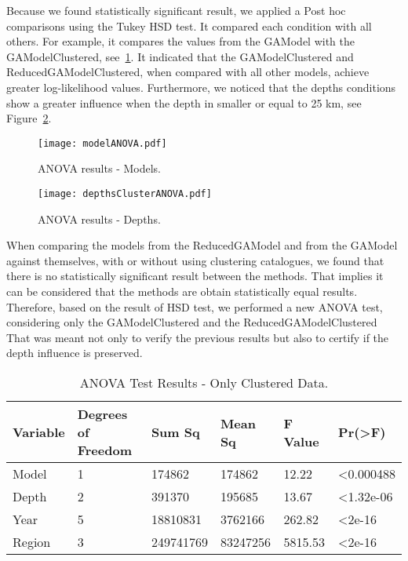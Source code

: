 Because we found statistically significant result, we applied a Post hoc comparisons using the Tukey HSD test. It compared each condition with all others. For example, it compares the values from the GAModel with the GAModelClustered, see~\ref{modelANOVA}. It indicated that the GAModelClustered and ReducedGAModelClustered, when compared with all other models, achieve greater log-likelihood values. Furthermore, we noticed that the depths conditions show a greater influence when the depth in smaller or equal to 25 km, see Figure~\ref{depthsANOVA}.\\

\begin{figure}[H]
	\centering
	\texttt{[image: modelANOVA.pdf]}
	\caption{ANOVA results - Models.}
	\label{modelANOVA}
\end{figure}

\begin{figure}[H]
	\centering
	\texttt{[image: depthsClusterANOVA.pdf]}
	\caption{ANOVA results - Depths.}
	\label{depthsANOVA}
\end{figure}

When comparing the models from the ReducedGAModel and from the GAModel against themselves, with or without using clustering catalogues, we found that there is no statistically significant result between the methods. That implies it can be considered that the methods are obtain statistically equal results.\\

Therefore, based on the result of HSD test, we performed a new ANOVA test, considering only the GAModelClustered and the ReducedGAModelClustered That was meant not only to verify the previous results but also to certify if the depth influence is preserved.\\

\begin{table*}[!ht]
	\centering
	\begin{tabular}{|l|l|l|l|l|l|}
		\hline
		{Variable} & {Degrees of Freedom} & {Sum Sq}    & {Mean Sq}   & {F Value} & {Pr(\textgreater F)} \\
		\hline
		Model    & 1           & 174862   & 174862   & 12.22   & \textless0.000488     \\
		\hline
		
		Depth    & 2                  & 391370  & 195685   & 13.67   & \textless1.32e-06     \\
		\hline
		Year     & 5                  & 18810831  & 3762166  & 262.82   & \textless2e-16     \\
		\hline
		Region   & 3                  & 249741769 & 83247256 & 5815.53 & \textless2e-16\\    
		\hline
	\end{tabular}
	\caption{ANOVA Test Results - Only Clustered Data.}
	\label{newanovatest}
\end{table*}


